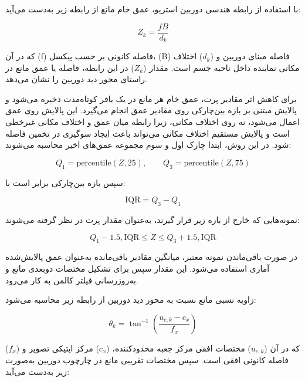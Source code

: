 با استفاده از رابطه هندسی دوربین استریو، عمق خام مانع از رابطه زیر به‌دست می‌آید:

\begin{equation}
	Z_k = \frac{fB}{d_k}
	\label{eq:app_stereo_depth}
\end{equation}

که در آن (f) فاصله کانونی بر حسب پیکسل، (B) فاصله مبنای دوربین و ($d_k$) اختلاف مکانی نماینده داخل ناحیه جسم است. مقدار ($Z_k$) در این رابطه، فاصله یا عمق مانع در راستای محور دید دوربین را نشان می‌دهد.

برای کاهش اثر مقادیر پرت، عمق خام هر مانع در یک بافر کوتاه‌مدت ذخیره می‌شود و پالایش مبتنی بر بازه بین‌چارکی  روی مقادیر عمق انجام می‌گیرد. این پالایش روی عمق اعمال می‌شود، نه روی اختلاف مکانی، زیرا رابطه میان عمق و اختلاف مکانی غیرخطی است و پالایش مستقیم اختلاف مکانی می‌تواند باعث ایجاد سوگیری در تخمین فاصله شود. در این روش، ابتدا چارک اول و سوم مجموعه عمق‌های اخیر محاسبه می‌شوند:

\begin{equation}
	Q_1 = \mathrm{percentile}(Z,25),
	\qquad
	Q_3 = \mathrm{percentile}(Z,75)
	\label{eq:app_iqr_quartiles}
\end{equation}

سپس بازه بین‌چارکی برابر است با:

\begin{equation}
	\mathrm{IQR} = Q_3 - Q_1
	\label{eq:app_iqr_definition}
\end{equation}

نمونه‌هایی که خارج از بازه زیر قرار گیرند، به‌عنوان مقدار پرت در نظر گرفته می‌شوند:

\begin{equation}
	Q_1 - 1.5,\mathrm{IQR}
	\leq
	Z
	\leq
	Q_3 + 1.5,\mathrm{IQR}
	\label{eq:app_iqr_bounds}
\end{equation}

در صورت باقی‌ماندن نمونه معتبر، میانگین مقادیر باقی‌مانده به‌عنوان عمق پالایش‌شده آماری استفاده می‌شود. این مقدار سپس برای تشکیل مختصات دوبعدی مانع و به‌روزرسانی فیلتر کالمن به کار می‌رود.

زاویه نسبی مانع نسبت به محور دید دوربین از رابطه زیر محاسبه می‌شود:

\begin{equation}
	\theta_k =
	\tan^{-1}
	\left(
	\frac{u_{c,k}-c_x}{f_x}
	\right)
	\label{eq:app_bearing}
\end{equation}

که در آن ($u_{c,k}$) مختصات افقی مرکز جعبه محدودکننده، ($c_x$) مرکز اپتیکی تصویر و ($f_x$) فاصله کانونی افقی است. سپس مختصات تقریبی مانع در چارچوب دوربین به‌صورت زیر به‌دست می‌آید:

